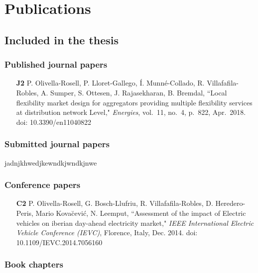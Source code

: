\chapter{Publications}


\section*{Included in the thesis}
\subsection*{Published journal papers}

\begin{itemize}
	
	\item [\textbf{J2}] P. Olivella-Rosell, P. Lloret-Gallego, \'{I}. Munn\'{e}-Collado, R. Villafafila-Robles, A. Sumper, S. Ottesen, J. Rajasekharan, B. Bremdal, ``Local flexibility market design for aggregators providing multiple flexibility services at distribution network Level," \textit{Energies}, vol.~11, no.~4, p.~822, Apr.~2018. doi: 10.3390/en11040822

	
\end{itemize}

\subsection*{Submitted journal papers}
jadnjkhwedjkewndkjwndkjnwe


\subsection*{Conference papers}

\begin{itemize}
		
	\item [\textbf{C2}] P. Olivella-Rosell, G. Bosch-Llufriu, R. Villafafila-Robles, D. Heredero-Peris, Mario Kova\u{c}evi\'{c}, N. Leemput, ``Assessment of the impact of Electric vehicles on iberian day-ahead electricity market,"  \textit{IEEE International Electric Vehicle Conference (IEVC)}, Florence, Italy, Dec. 2014. doi: 10.1109/IEVC.2014.7056160	

	
\end{itemize}

\subsection*{Book chapters}

